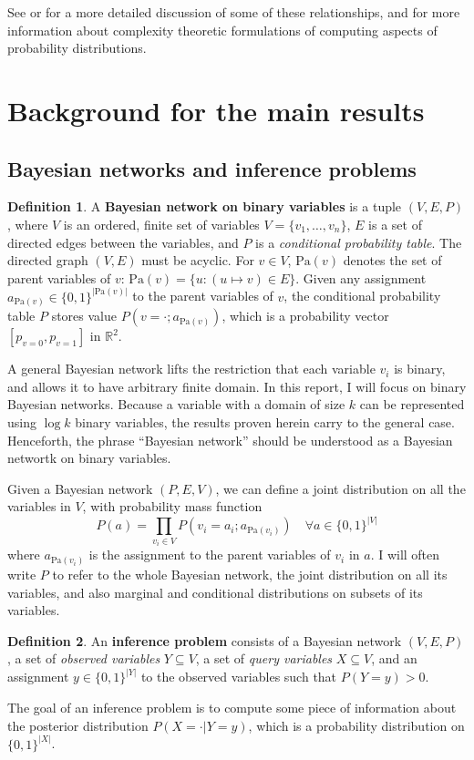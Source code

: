 \documentclass{article}
\theoremstyle{definition}
\newtheorem{defn}{Definition}
\theoremstyle{remark}
\def \Pa{\text{Pa}}
\begin{document}
\noindent See \cite{yamakami1999polynomial} or \cite{edmonds2017concepts} for a more detailed discussion of some of these relationships, and for more information about complexity theoretic formulations of computing aspects of probability distributions.

\section{Background for the main results} \label{sec:background}

\subsection{Bayesian networks and inference problems}
\begin{defn}
A \textbf{Bayesian network on binary variables} is a tuple $(V, E, P)$, where $V$ is an ordered, finite set of variables $V = \{v_1, \dots, v_n\}$, $E$ is a set of directed edges between the variables, and $P$ is a \textit{conditional probability table}.
The directed graph $(V, E)$ must be acyclic.
For $v \in V$, $\Pa(v)$ denotes the set of parent variables of $v$: $\Pa(v) = \{u : (u \mapsto v) \in E\}$.
Given any assignment $a_{\Pa(v)} \in \{0, 1\}^{|\Pa(v)|}$ to the parent variables of $v$, the conditional probability table $P$ stores value $P(v = \cdot ; a_{\Pa(v)})$, which is a probability vector $[p_{v=0}, p_{v=1}]$ in $\mathbb{R}^2$.
\end{defn}

A general Bayesian network lifts the restriction that each variable $v_i$ is binary, and allows it to have arbitrary finite domain.
In this report, I will focus on binary Bayesian networks. Because a variable with a domain of size $k$ can be represented using $\log k$ binary variables, the results proven herein carry to the general case.
Henceforth, the phrase ``Bayesian network'' should be understood as a Bayesian networtk on binary variables.

Given a Bayesian network $(P, E, V)$, we can define a joint distribution on all the variables in $V$, with probability mass function
$$
P(a) = \prod_{v_i \in V}{P(v_i = a_i ; a_{\Pa(v_i)})} \quad \forall a \in \{0, 1\}^{|V|}
$$
where $a_{\Pa(v_i)}$ is the assignment to the parent variables of $v_i$ in $a$.
I will often write $P$ to refer to the whole Bayesian network, the joint distribution on all its variables, and also marginal and conditional distributions on subsets of its variables.

\begin{defn}
An \textbf{inference problem} consists of a Bayesian network $(V, E, P)$, a set of \textit{observed variables} $Y \subseteq V$, a set of \textit{query variables} $X \subseteq V$, and an assignment $y \in \{0, 1\}^{|Y|}$ to the observed variables such that $P(Y = y) > 0$.
\end{defn}
The goal of an inference problem is to compute some piece of information about the posterior distribution $P(X = \cdot | Y = y)$, which is a probability distribution on $\{0, 1\}^{|X|}$.
\end{document}
